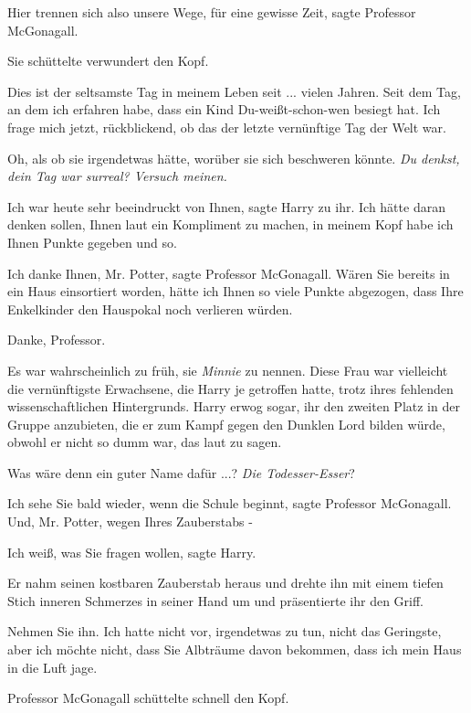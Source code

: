 \glqq{}Hier trennen sich also unsere Wege, für eine gewisse Zeit\grqq{}, sagte
Professor McGonagall.

Sie schüttelte verwundert den Kopf.

\glqq{}Dies ist der seltsamste Tag in meinem Leben seit ... vielen Jahren. Seit
dem Tag, an dem ich erfahren habe, dass ein Kind Du-weißt-schon-wen besiegt hat.
Ich frage mich jetzt, rückblickend, ob das der letzte vernünftige Tag der Welt
war.\grqq{}

Oh, als ob sie irgendetwas hätte, worüber sie sich beschweren könnte. \emph{Du
denkst, dein Tag war surreal? Versuch meinen.}

\glqq{}Ich war heute sehr beeindruckt von Ihnen\grqq{}, sagte Harry zu ihr.
\glqq Ich hätte daran denken sollen, Ihnen laut ein Kompliment zu machen, in
meinem Kopf habe ich Ihnen Punkte gegeben und so.\grqq{}

\glqq{}Ich danke Ihnen, Mr. Potter\grqq{}, sagte Professor McGonagall. \glqq{}
Wären Sie bereits in ein Haus einsortiert worden, hätte ich Ihnen so viele
Punkte abgezogen, dass Ihre Enkelkinder den Hauspokal noch verlieren
würden.\grqq{}

\glqq{}Danke, Professor.\grqq{}

Es war wahrscheinlich zu früh, sie \emph{Minnie} zu nennen. Diese Frau war
vielleicht die vernünftigste Erwachsene, die Harry je getroffen hatte, trotz
ihres fehlenden wissenschaftlichen Hintergrunds. Harry erwog sogar, ihr den
zweiten Platz in der Gruppe anzubieten, die er zum Kampf gegen den Dunklen Lord
bilden würde, obwohl er nicht so dumm war, das laut zu sagen.

Was wäre denn ein guter Name dafür ...? \emph{Die Todesser-Esser}?

\glqq{}Ich sehe Sie bald wieder, wenn die Schule beginnt\grqq{}, sagte Professor
McGonagall. \glqq{}Und, Mr. Potter, wegen Ihres Zauberstabs -\grqq{}

\glqq{}Ich weiß, was Sie fragen wollen\grqq{}, sagte Harry.

Er nahm seinen kostbaren Zauberstab heraus und drehte ihn mit einem tiefen Stich
inneren Schmerzes in seiner Hand um und präsentierte ihr den Griff.

\glqq{}Nehmen Sie ihn. Ich hatte nicht vor, irgendetwas zu tun, nicht das
Geringste, aber ich möchte nicht, dass Sie Albträume davon bekommen, dass ich
mein Haus in die Luft jage.\grqq{}

Professor McGonagall schüttelte schnell den Kopf.

